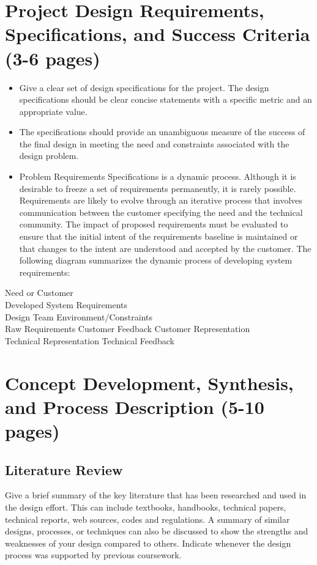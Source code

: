 \documentclass[12pt]{article}
\begin{document}
\section{Project Design Requirements, Specifications, and Success Criteria (3-6 pages)}
\begin{itemize}[noitemsep]
    \item Give a clear set of design specifications for the project. The design specifications should be clear concise statements with a specific metric and an appropriate value.
    \item The specifications should provide an unambiguous measure of the success of the final design in meeting the need and constraints associated with the design problem.
    \item Problem Requirements Specifications is a dynamic process. Although it is desirable to freeze a set of requirements permanently, it is rarely possible. Requirements are likely to evolve through an iterative process that involves communication between the customer specifying the need and the technical community. The impact of proposed requirements must be evaluated to ensure that the initial intent of the requirements baseline is maintained or that changes to the intent are understood and accepted by the customer. The following diagram summarizes the dynamic process of developing system requirements:
\end{itemize}

\begin{center}
Need or Customer \\
Developed System Requirements \\
Design Team Environment/Constraints \\
Raw Requirements \quad Customer Feedback \quad Customer Representation \\
Technical Representation \quad Technical Feedback
\end{center}

\section{Concept Development, Synthesis, and Process Description (5-10 pages)}
\subsection{Literature Review}
Give a brief summary of the key literature that has been researched and used in the design effort. This can include textbooks, handbooks, technical papers, technical reports, web sources, codes and regulations. A summary of similar designs, processes, or techniques can also be discussed to show the strengths and weaknesses of your design compared to others. Indicate whenever the design process was supported by previous coursework.
\end{document}

